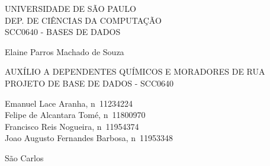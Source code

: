 \documentclass[article,	12pt, oneside, 	a4paper, english, brazil
]{abntex2}
\begin{document}
\pagestyle{meuestilo}

\begin{capa}

	\begin{center}
		{\MakeUppercase{\Large Universidade de São Paulo}}\\
		{\MakeUppercase{\large Dep. de Ciências da Computação}}\\
		{\MakeUppercase{\large SCC0640 - Bases de Dados}}

		\vspace{2cm}

		\begin{flushright}
			Elaine Parros Machado de Souza
		\end{flushright}


		\vspace{4cm}

		{\MakeUppercase{\large Auxílio a Dependentes Químicos e Moradores de Rua}}
		\\[0.125cm]
		{\MakeUppercase {\normalsize Projeto de Base de Dados - SCC0640 }}\\[3cm]
	\end{center}

	\begin{flushright}
		{\large	Emanuel Lace Aranha, n\textdegree ~11234224}\\
		{\large	Felipe de Alcantara Tomé, n\textdegree ~11800970}\\
		{\large	Francisco Reis Nogueira, n\textdegree ~11954374}\\
		{\large	Joao Augusto Fernandes Barbosa, n\textdegree ~11953348}\\

	\end{flushright}

	\begin{center}
		\vfill
		São Carlos \\
		\the\year  %

	\end{center}
\end{capa}


\vspace{3cm}

\end{document}
